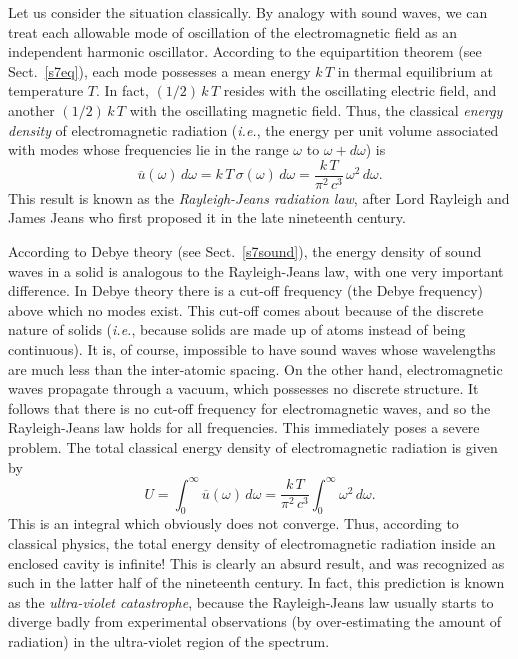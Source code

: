 Let us consider the situation classically. By analogy with sound waves, we can treat
each allowable mode of oscillation of the electromagnetic field as an independent
harmonic oscillator. According to the equipartition theorem
(see Sect.~\ref{s7eq}), each mode possesses a
mean energy $k\,T$ in thermal equilibrium at temperature $T$. In fact, $(1/2)\,k\,T$
resides with the oscillating electric field, and another $(1/2)\,k\,T$ with
the oscillating magnetic field.
Thus,
the classical {\em energy density} of electromagnetic radiation ({\em i.e.}, the
energy per unit volume associated with modes whose frequencies lie in the
range $\omega$ to $\omega + d\omega$) is
\begin{equation}
\overline{u}(\omega)\,d\omega = k\,T \,\sigma(\omega) \,d\omega = \frac{k\,T}
{\pi^2 \,c^3}
\,\omega^2\,d\omega.
\end{equation}
This result is known as the {\em Rayleigh-Jeans radiation law}, after Lord Rayleigh
and James Jeans who first proposed it in the late nineteenth century.


According to Debye theory (see Sect.~\ref{s7sound}),
  the energy density of sound waves in a solid is 
analogous to the Rayleigh-Jeans law, with one very important difference. 
In Debye theory
there is a cut-off frequency (the Debye frequency) above which 
no modes exist. This cut-off comes about because of the discrete nature of
solids ({\em i.e.}, because solids 
 are made up of atoms instead of being continuous).
It is, of course, 
 impossible to have sound waves whose wavelengths are much less than
the inter-atomic spacing. 
On the other hand, electromagnetic waves propagate through a vacuum,
which possesses no discrete structure. It follows that
there is no cut-off frequency for electromagnetic waves, and so the Rayleigh-Jeans
law holds for all frequencies. This immediately poses a severe problem. The total
classical energy density of  electromagnetic radiation is given by
\begin{equation}
U = \int_0^{\infty} \overline{u}(\omega)
\,d\omega = \frac{k\,T}{\pi^2 \,c^3} \int_0^{\infty}
\omega^2\,d\omega.
\end{equation}
This  is an integral which obviously does not converge. Thus, according to classical
physics, the total energy density of electromagnetic radiation inside  an enclosed cavity
is infinite! This is clearly an absurd result, and was recognized as such
in the latter half of the nineteenth century. In fact, this  prediction
is known as the {\em ultra-violet catastrophe}, because the Rayleigh-Jeans
law usually starts to diverge badly from experimental
observations (by over-estimating the amount of radiation) in the 
ultra-violet region of the spectrum.

